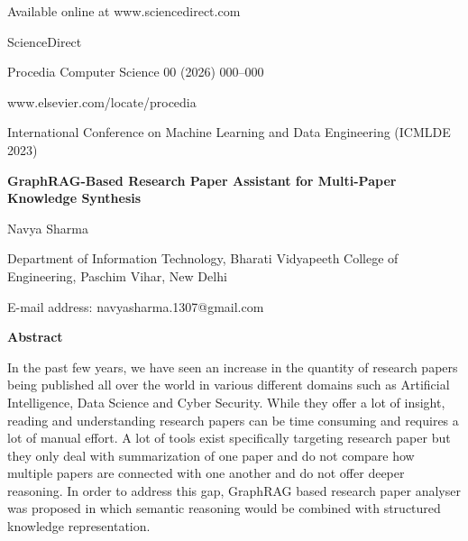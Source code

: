 \documentclass[10pt]{article}
\begin{document}
\thispagestyle{empty}
\begin{center}
{\small Available online at www.sciencedirect.com\par}
{\LARGE ScienceDirect\par}
{\small Procedia Computer Science 00 (2026) 000--000\par}
\vspace{4pt}
{\small www.elsevier.com/locate/procedia\par}
\vspace{12pt}
{\small International Conference on Machine Learning and Data Engineering (ICMLDE 2023)\par}
\vspace{14pt}
{\Large\bfseries GraphRAG-Based Research Paper Assistant for Multi-Paper Knowledge Synthesis\par}
\vspace{10pt}
{\normalsize Navya Sharma\par}
\vspace{5pt}
{\small Department of Information Technology, Bharati Vidyapeeth College of Engineering, Paschim Vihar, New Delhi\par}
{\small E-mail address: navyasharma.1307@gmail.com\par}
\end{center}

\vspace{8pt}
\textbf{Abstract}\par
In the past few years, we have seen an increase in the quantity of research papers being published all over the world in various different domains such as Artificial Intelligence, Data Science and Cyber Security. While they offer a lot of insight, reading and understanding research papers can be time consuming and requires a lot of manual effort. A lot of tools exist specifically targeting research paper but they only deal with summarization of one paper and do not compare how multiple papers are connected with one another and do not offer deeper reasoning. In order to address this gap, GraphRAG based research paper analyser was proposed in which semantic reasoning would be combined with structured knowledge representation.
\end{document}
